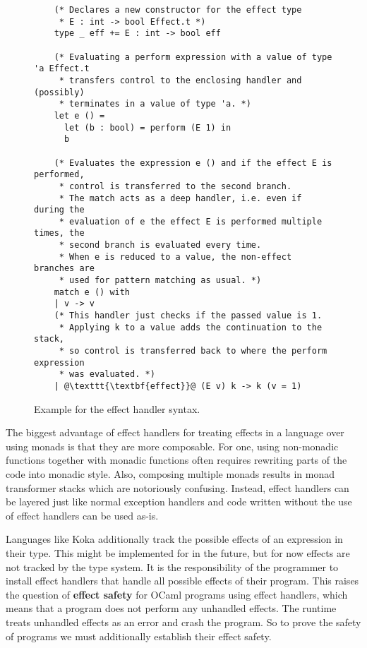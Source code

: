 \begin{figure}[ht]
    \begin{verbatim}
    (* Declares a new constructor for the effect type 
     * E : int -> bool Effect.t *)
    type _ eff += E : int -> bool eff

    (* Evaluating a perform expression with a value of type 'a Effect.t 
     * transfers control to the enclosing handler and (possibly)
     * terminates in a value of type 'a. *)
    let e () = 
      let (b : bool) = perform (E 1) in
      b

    (* Evaluates the expression e () and if the effect E is performed,
     * control is transferred to the second branch.
     * The match acts as a deep handler, i.e. even if during the 
     * evaluation of e the effect E is performed multiple times, the
     * second branch is evaluated every time.
     * When e is reduced to a value, the non-effect branches are 
     * used for pattern matching as usual. *)
    match e () with
    | v -> v
    (* This handler just checks if the passed value is 1.
     * Applying k to a value adds the continuation to the stack,
     * so control is transferred back to where the perform expression 
     * was evaluated. *)
    | @\texttt{\textbf{effect}}@ (E v) k -> k (v = 1)
\end{verbatim}
    \caption{Example for the effect handler syntax.}
    \label{fig:effect-example}
\end{figure}

The biggest advantage of effect handlers for treating effects in a language over using monads is that they are more composable.
For one, using non-monadic functions together with monadic functions often requires rewriting parts of the code into monadic style.
Also, composing multiple monads results in monad transformer stacks which are notoriously confusing.
Instead, effect handlers can be layered just like normal exception handlers and code written without the use of effect handlers can be used as-is.

Languages like Koka additionally track the possible effects of an expression in their type.
This might be implemented for \ocf{} in the future, but for now effects are not tracked by the type system.
It is the responsibility of the programmer to install effect handlers that handle all possible effects of their program.
This raises the question of \textbf{effect safety} for OCaml programs using effect handlers, which means that a program does not perform any unhandled effects.
The \ocf{} runtime treats unhandled effects as an error and crash the program.
So to prove the safety of \ocf{} programs we must additionally establish their effect safety.

